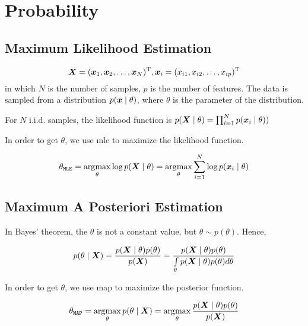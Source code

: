 \chapter{Probability}\label{chp:Probability}
\minitoc


\section{Maximum Likelihood Estimation}

\begin{equation}
	\vX = (\vx_1, \vx_2, \dots, \vx_N)\transp, \vx_i = (x_{i1}, x_{i2},\dots, x_{ip})\transp
\end{equation}
in which $N$ is the number of samples, $p$ is the number of features.
The data is sampled from a distribution $p\giventhat{\vx}{\theta}$, where $\theta$ is the parameter of the distribution.


For \(N\)  i.i.d. samples, the likelihood function is \(p \giventhat{\vX}{\theta} = \prod_{i=1}^{N} p \giventhat{\vx_i}{\theta}) \)

In order to get \(\theta\), we use \gls{mle}  to maximize the likelihood function.

\begin{equation}
	\theta_{\mathtt{MLE}} = \argmax_{\theta} \log p\giventhat{\vX}{\theta} = \argmax_{\theta} \sum_{i=1}^{N} \log p\giventhat{\vx_i}{\theta}
\end{equation}

\section{Maximum A Posteriori Estimation}
In Bayes' theorem, the \(\theta\) is not a constant value, but \(\theta \sim  p(\theta) \).
Hence,

\begin{equation}
	p\giventhat{\theta}{\vX} = \frac{p\giventhat{\vX}{\theta} p(\theta)}{p(\vX)}  =  \frac{p\giventhat{\vX}{\theta} p(\theta)}{\int\limits_{\theta} p\giventhat{\vX}{\theta} p(\theta) d\theta}
\end{equation}


In order to get \(\theta\), we use \gls{map}  to maximize the posterior function.

\begin{equation}
	\theta_{\mathtt{MAP}} = \argmax_{\theta} p\giventhat{\theta}{\vX} = \argmax_{\theta} \frac{p\giventhat{\vX}{\theta} p(\theta)}{p(\vX)}
\end{equation}


